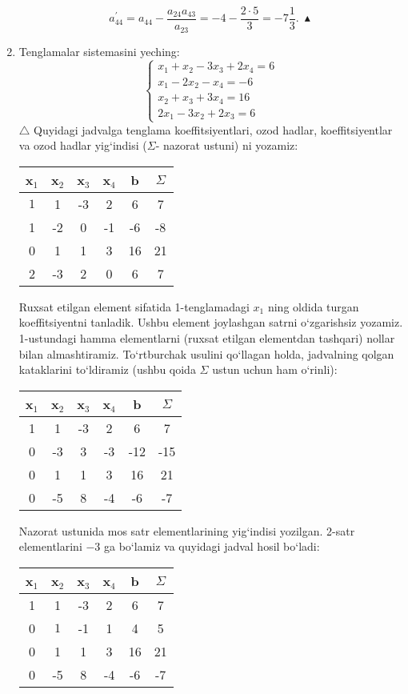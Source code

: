 \begin{enumerate}
	$$a_{44}^{\prime}=a_{44}-\frac{a_{24}a_{43}}{a_{23}}=-4-\frac{2\cdot5}{3}=-7\frac{1}{3}.\ \blacktriangle$$
	\item Tenglamalar sistemasini yeching:
	$$\begin{cases}
		x_{1}+x_{2}-3x_{3}+2x_{4}=6\\
		x_{1}-2x_{2}-x_{4}=-6\\
		x_{2}+x_{3}+3x_{4}=16\\
		2x_{1}-3x_{2}+2x_{3}=6
	\end{cases}$$
	$\triangle$ Quyidagi jadvalga tenglama koeffitsiyentlari, ozod hadlar, koeffitsiyentlar va ozod hadlar yig`indisi ($\Sigma$- nazorat ustuni) ni yozamiz:
	\begin{center}
		\begin{tabular}{|c|c|c|c|c|c|}
			\hline
			\textbf{x}$_{1}$&\textbf{x}$_{2}$&\textbf{x}$_{3}$&\textbf{x}$_{4}$&\textbf{b}&$\Sigma$\\ \hline
			$\boxed{1}$&1&-3&2&6&7\\ \hline
			1&-2&0&-1&-6&-8\\ \hline
			0&1&1&3&16&21\\ \hline
			2&-3&2&0&6&7\\ \hline
		\end{tabular}
	\end{center}
Ruxsat etilgan element sifatida 1-tenglamadagi $x_{1}$ ning oldida turgan koeffitsiyentni tanladik. Ushbu element joylashgan satrni o`zgarishsiz yozamiz. 1-ustundagi hamma elementlarni (ruxsat etilgan elementdan tashqari) nollar bilan almashtiramiz. To`rtburchak usulini qo`llagan holda, jadvalning qolgan kataklarini to`ldiramiz (ushbu qoida $\Sigma$ ustun uchun ham o`rinli):
\begin{center}
	\begin{tabular}{|c|c|c|c|c|c|}
		\hline
		\textbf{x}$_{1}$&\textbf{x}$_{2}$&\textbf{x}$_{3}$&\textbf{x}$_{4}$&\textbf{b}&$\Sigma$\\ \hline
		1&1&-3&2&6&7\\ \hline
		0&-3&3&-3&-12&-15\\ \hline
		0&1&1&3&16&21\\ \hline
		0&-5&8&-4&-6&-7\\ \hline
	\end{tabular}
\end{center}
Nazorat ustunida mos satr elementlarining yig`indisi yozilgan. 2-satr elementlarini $-3$ ga bo`lamiz va quyidagi jadval hosil bo`ladi:
\begin{center}
	\begin{tabular}{|c|c|c|c|c|c|}
		\hline
		\textbf{x}$_{1}$&\textbf{x}$_{2}$&\textbf{x}$_{3}$&\textbf{x}$_{4}$&\textbf{b}&$\Sigma$\\ \hline
		1&1&-3&2&6&7\\ \hline
		0&$\boxed{1}$&-1&1&4&5\\ \hline
		0&1&1&3&16&21\\ \hline
		0&-5&8&-4&-6&-7\\ \hline
	\end{tabular}
\end{center}


\end{enumerate}
